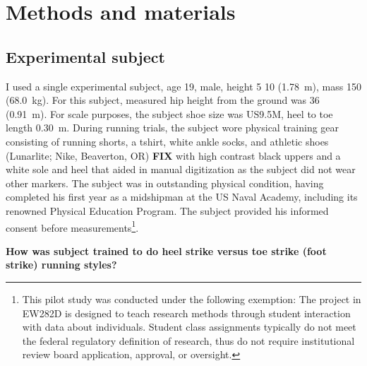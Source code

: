 \section{Methods and materials}
\label{sec:methods}

\subsection{Experimental subject}
I used a single experimental subject, age \SI{19}{\year}, male, height \SI{5}{\foot} \SI{10}{\inch} (\SI{1.78}{\meter}), mass \SI{150}{\pound} (\SI{68.0}{\kilo\gram}). For this subject, measured hip height from the ground was \SI{36}{\inch} (\SI{0.91}{\meter}). For scale purposes, the subject shoe size was US9.5M, heel to toe length \SI{0.30}{\meter}. During running trials, the subject wore physical training gear consisting of running shorts, a tshirt, white ankle socks, and athletic shoes (Lunarlite; Nike, Beaverton, OR) \textbf{FIX} with high contrast black uppers and a white sole and heel that aided in manual digitization as the subject did not wear other markers. The subject was in outstanding physical condition, having completed his first year as a midshipman at the US Naval Academy, including its renowned Physical Education Program. The subject provided his informed consent before measurements\footnote{This pilot study was conducted under the following exemption: The project in EW282D is designed to teach research methods through student interaction with data about individuals. Student class assignments typically do not meet the federal regulatory definition of research, thus do not require institutional review board application, approval, or oversight.}.  

\textbf{How was subject trained to do heel strike versus toe strike (foot strike) running styles?}



